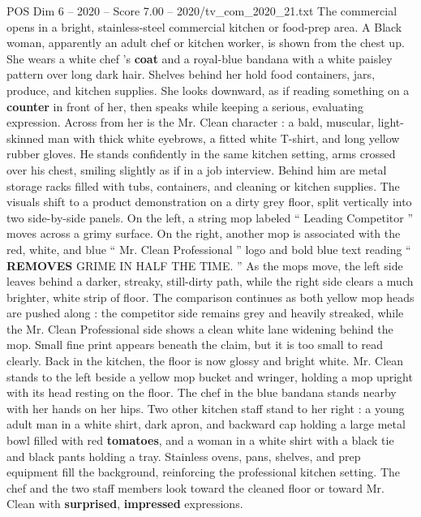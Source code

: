 \begin{textsample}{POS Dim 6 – 2020 – Score 7.00 – 2020/tv\_com\_2020\_21.txt}  \label{ex:f6_pos_069}
The commercial opens in a bright, stainless-steel commercial kitchen or food-prep area.
A Black woman, apparently an adult chef or kitchen worker, is shown from the chest up.
She wears a white chef ’s \textbf{coat} and a royal-blue bandana with a white paisley pattern over long dark hair.
Shelves behind her hold food containers, jars, produce, and kitchen supplies.
She looks downward, as if reading something on a \textbf{counter} in front of her, then speaks while keeping a serious, evaluating expression.
Across from her is the Mr.
Clean character : a bald, muscular, light-skinned man with thick white eyebrows, a fitted white T-shirt, and long yellow rubber gloves.
He stands confidently in the same kitchen setting, arms crossed over his chest, smiling slightly as if in a job interview.
Behind him are metal storage racks filled with tubs, containers, and cleaning or kitchen supplies.
The visuals shift to a product demonstration on a dirty grey floor, split vertically into two side-by-side panels.
On the left, a string mop labeled “ Leading Competitor ” moves across a grimy surface.
On the right, another mop is associated with the red, white, and blue “ Mr.
Clean Professional ” logo and bold blue text reading “ \textbf{REMOVES} GRIME IN HALF THE TIME. ” As the mops move, the left side leaves behind a darker, streaky, still-dirty path, while the right side clears a much brighter, white strip of floor.
The comparison continues as both yellow mop heads are pushed along : the competitor side remains grey and heavily streaked, while the Mr.
Clean Professional side shows a clean white lane widening behind the mop.
Small fine print appears beneath the claim, but it is too small to read clearly.
Back in the kitchen, the floor is now glossy and bright white.
Mr.
Clean stands to the left beside a yellow mop bucket and wringer, holding a mop upright with its head resting on the floor.
The chef in the blue bandana stands nearby with her hands on her hips.
Two other kitchen staff stand to her right : a young adult man in a white shirt, dark apron, and backward cap holding a large metal bowl filled with red \textbf{tomatoes}, and a woman in a white shirt with a black tie and black pants holding a tray.
Stainless ovens, pans, shelves, and prep equipment fill the background, reinforcing the professional kitchen setting.
The chef and the two staff members look toward the cleaned floor or toward Mr.
Clean with \textbf{surprised}, \textbf{impressed} expressions.

\end{textsample}
